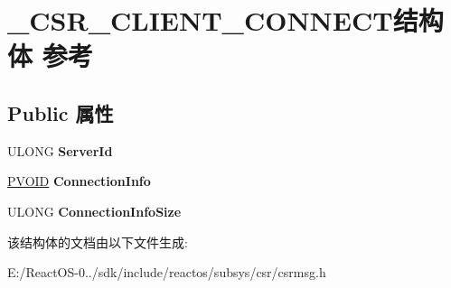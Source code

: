 \hypertarget{struct___c_s_r___c_l_i_e_n_t___c_o_n_n_e_c_t}{}\section{\+\_\+\+C\+S\+R\+\_\+\+C\+L\+I\+E\+N\+T\+\_\+\+C\+O\+N\+N\+E\+C\+T结构体 参考}
\label{struct___c_s_r___c_l_i_e_n_t___c_o_n_n_e_c_t}
\subsection*{Public 属性}
\begin{DoxyCompactItemize}
\item 
\mbox{\label{struct___c_s_r___c_l_i_e_n_t___c_o_n_n_e_c_t_a564f15eedbe79a91c5ae020e20b5b43e}} 
U\+L\+O\+NG {\bfseries Server\+Id}
\item 
\mbox{\label{struct___c_s_r___c_l_i_e_n_t___c_o_n_n_e_c_t_ae4e59bb2293b402c009b19ea938d7433}} 
\hyperlink{interfacevoid}{P\+V\+O\+ID} {\bfseries Connection\+Info}
\item 
\mbox{\label{struct___c_s_r___c_l_i_e_n_t___c_o_n_n_e_c_t_acf9550466ac273efc35fc48484ec55ea}} 
U\+L\+O\+NG {\bfseries Connection\+Info\+Size}
\end{DoxyCompactItemize}


该结构体的文档由以下文件生成\+:\begin{DoxyCompactItemize}
\item 
E\+:/\+React\+O\+S-\/0../sdk/include/reactos/subsys/csr/csrmsg.\+h\end{DoxyCompactItemize}
